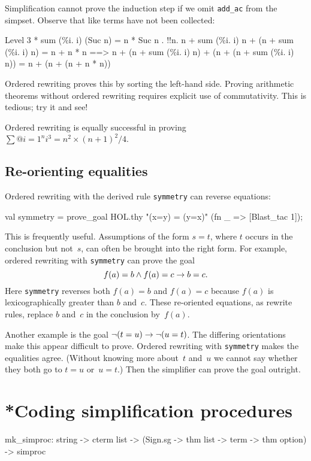 Simplification cannot prove the induction step if we omit \texttt{add_ac} from
the simpset.  Observe that like terms have not been collected:
\begin{ttbox}
{\out Level 3}
{ * sum (\%i. i) (Suc n) = n * Suc n}
{. !!n. n + sum (\%i. i) n + (n + sum (\%i. i) n) = n + n * n}
{\out           ==> n + (n + sum (\%i. i) n) + (n + (n + sum (\%i. i) n)) =}
{\out               n + (n + (n + n * n))}
\end{ttbox}
Ordered rewriting proves this by sorting the left-hand side.  Proving
arithmetic theorems without ordered rewriting requires explicit use of
commutativity.  This is tedious; try it and see!

Ordered rewriting is equally successful in proving
$\sum@{i=1}^n i^3 = n^2\times(n+1)^2/4$.


\subsection{Re-orienting equalities}
Ordered rewriting with the derived rule \texttt{symmetry} can reverse
equations:
\begin{ttbox}
val symmetry = prove_goal HOL.thy "(x=y) = (y=x)"
                 (fn _ => [Blast_tac 1]);
\end{ttbox}
This is frequently useful.  Assumptions of the form $s=t$, where $t$ occurs
in the conclusion but not~$s$, can often be brought into the right form.
For example, ordered rewriting with \texttt{symmetry} can prove the goal
\[ f(a)=b \wedge f(a)=c \rightarrow b=c. \]
Here \texttt{symmetry} reverses both $f(a)=b$ and $f(a)=c$
because $f(a)$ is lexicographically greater than $b$ and~$c$.  These
re-oriented equations, as rewrite rules, replace $b$ and~$c$ in the
conclusion by~$f(a)$. 

Another example is the goal $\neg(t=u) \rightarrow \neg(u=t)$.
The differing orientations make this appear difficult to prove.  Ordered
rewriting with \texttt{symmetry} makes the equalities agree.  (Without
knowing more about~$t$ and~$u$ we cannot say whether they both go to $t=u$
or~$u=t$.)  Then the simplifier can prove the goal outright.



\section{*Coding simplification procedures}
\begin{ttbox}
mk_simproc: string -> cterm list ->
              (Sign.sg -> thm list -> term -> thm option) -> simproc
\end{ttbox}


